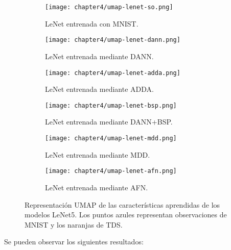 \begin{figure}[H]
    \centering
    \begin{subfigure}[h]{0.40\textwidth}
        \texttt{[image: chapter4/umap-lenet-so.png]}
        \caption{LeNet entrenada con MNIST.}
        \label{fig:umap-lenet-so}
    \end{subfigure}
    \hfill
    \begin{subfigure}[h]{0.40\textwidth}
        \texttt{[image: chapter4/umap-lenet-dann.png]}
        \caption{LeNet entrenada mediante DANN.}
        \label{fig:umap-lenet-dann}
    \end{subfigure}
    \hfill
    \begin{subfigure}[h]{0.40\textwidth}
        \texttt{[image: chapter4/umap-lenet-adda.png]}
        \caption{LeNet entrenada mediante ADDA.}
        \label{fig:umap-lenet-adda}
    \end{subfigure}
    \hfill
    \begin{subfigure}[h]{0.40\textwidth}
        \texttt{[image: chapter4/umap-lenet-bsp.png]}
        \caption{LeNet entrenada mediante DANN+BSP.}
        \label{fig:umap-lenet-bsp}
    \end{subfigure}
    \hfill
    \begin{subfigure}[h]{0.40\textwidth}
        \texttt{[image: chapter4/umap-lenet-mdd.png]}
        \caption{LeNet entrenada mediante MDD.}
        \label{fig:umap-lenet-mdd}
    \end{subfigure}
    \hfill
    \begin{subfigure}[h]{0.40\textwidth}
        \texttt{[image: chapter4/umap-lenet-afn.png]}
        \caption{LeNet entrenada mediante AFN.}
        \label{fig:umap-lenet-afn}
    \end{subfigure}

    \caption[Representación UMAP de las características aprendidas de los modelos LeNet5]{Representación UMAP de las características aprendidas de los modelos LeNet5. Los puntos azules representan observaciones de MNIST y los naranjas de TDS.}
    \label{fig:umaps-lenet}
\end{figure}

Se pueden observar los siguientes resultados:

